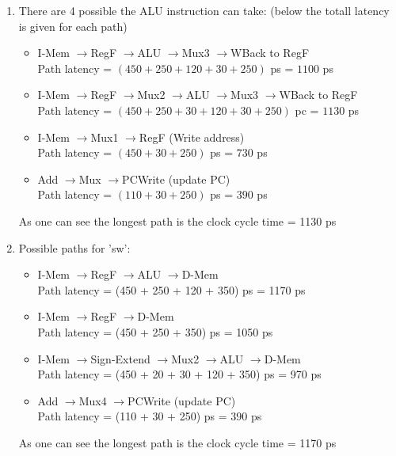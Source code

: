 \documentclass[a4paper]{article}
\renewcommand{\textrightarrow}{$\rightarrow$}
\begin{document}
\begin{enumerate}[label=(\alph*)]
	\item There are 4 possible the ALU instruction can take: (below the totall latency is given for each path)
	\begin{itemize}
		\item 
		I-Mem \textrightarrow RegF \textrightarrow ALU \textrightarrow Mux3 \textrightarrow WBack to RegF\\
		Path latency = $(450 + 250 + 120 + 30 + 250)$ ps =  $1100$ ps
		\item 
		I-Mem \textrightarrow RegF \textrightarrow Mux2 \textrightarrow ALU \textrightarrow Mux3 \textrightarrow WBack to RegF\\
		Path latency = $(450 + 250 + 30 + 120 + 30 + 250)$ pc = $1130$ ps
		\item 
		I-Mem \textrightarrow Mux1 \textrightarrow  RegF (Write address)\\
		Path latency = $(450 + 30 + 250)$ ps = $730$ ps
		\item 
		Add \textrightarrow Mux \textrightarrow PCWrite (update PC)\\
		Path latency = $(110 + 30 + 250)$ ps = $390$ ps
	\end{itemize}
	As one can see the longest path is the clock cycle time = 1130 ps
	
	\item Possible paths for 'sw':
	\begin{itemize}
		\item 
		I-Mem \textrightarrow RegF \textrightarrow ALU \textrightarrow D-Mem\\
		Path latency = (450 + 250 + 120 + 350) ps = 1170 ps
		\item 
		I-Mem \textrightarrow RegF \textrightarrow D-Mem\\
		Path latency = (450 + 250 + 350) ps = 1050 ps
		\item 
		I-Mem \textrightarrow Sign-Extend \textrightarrow Mux2 \textrightarrow ALU \textrightarrow D-Mem\\
		Path latency = (450 + 20 + 30 + 120 + 350) ps = 970 ps
		\item 
		Add \textrightarrow Mux4 \textrightarrow PCWrite (update PC)\\
		Path latency = (110 + 30 + 250) ps = 390 ps
	\end{itemize}
	As one can see the longest path is the clock cycle time = 1170 ps
	

\end{enumerate}
\end{document}
